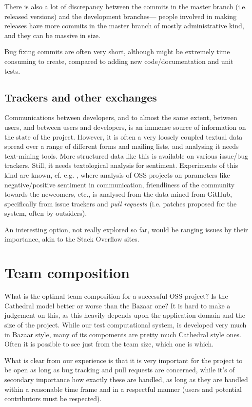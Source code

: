 \documentclass{deliverablereport}
\begin{document}
There is also a lot of discrepancy between the commits in the
master branch (i.e. released versions) and the development branches---
people involved in making releases have more commits in the master
branch of mostly administrative kind, and they can be massive in size.

Bug fixing commits are often very short, although might be extremely
time consuming to create, compared to adding new code/documentation
and unit tests.


\subsection{Trackers and other exchanges}\label{wp7:sect:sentana}
Communications between developers, and to almost the same extent,
between users, and between users and developers, is an immense
source of information on the state of the project.
However, it is often a very loosely coupled textual data spread
over a range of different forms and mailing lists, and analysing it
needs text-mining tools. More structured data like this is available
on various issue/bug trackers. Still, it needs textological analysis for
sentiment. Experiments of this kind are known, cf. e.g.
\cite{wp7:fossheartbeat}, where analysis of OSS projects on parameters
like negative/positive sentiment in communication, friendliness of the
community towards the newcomers, etc., is analysed from the data
mined from GitHub, specifically from issue trackers and 
{\em pull requests} (i.e. patches proposed for the system, often by outsiders).

An interesting option, not really explored so far, would be 
ranging issues by their importance, akin to the Stack Overflow
\cite{wp7:stackoverflow} sites.

\section{Team composition}
What is the optimal team composition for a successful OSS project?
Is the Cathedral model \cite{raymond99:cathedral-bazaar}
better or worse than the Bazaar one? It is hard to make a judgement on this,
as this heavily depends upon the application domain and the
size of the project. While our test computational system, \Sage
is developed very much in Bazaar style, many of its compoments
are pretty much Cathedral style ones.
Often it is possible to see just from the team size, which one is which.

What is clear from our experience is that it is very important
for the project to be open as long as bug tracking and pull requests
are concerned, while it's of secondary importance how exactly these are handled,
as long as they are handled within a reasonable time frame and in 
a respectful manner (users and potential contributors must be
respected).
\end{document}
